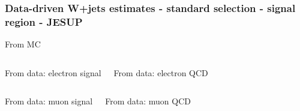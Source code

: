 \documentclass[red,compress,xcolor=table]{beamer}
\begin{document}
\begin{frame}
  \frametitle{Data-driven W+jets estimates - standard selection - signal region - JESUP}

\vspace*{-0.5cm}
\begin{block}{\scriptsize From MC}
\begin{center}
    {\tiny
      
    }
\end{center}
  \end{block}

\vspace*{-0.2cm}
\begin{columns}
  \begin{block}{\scriptsize From data: electron signal}
    {\tiny
      
    }
  \end{block}
  \begin{block}{\scriptsize From data: electron QCD}
    {\tiny
      
    }
  \end{block}
\end{columns}
\begin{columns}
  \begin{block}{\scriptsize From data: muon signal}
    {\tiny
      
    }
  \end{block}
  \begin{block}{\scriptsize From data: muon QCD}
    {\tiny
      
    }
  \end{block}
\end{columns}


\end{frame}
\end{document}
